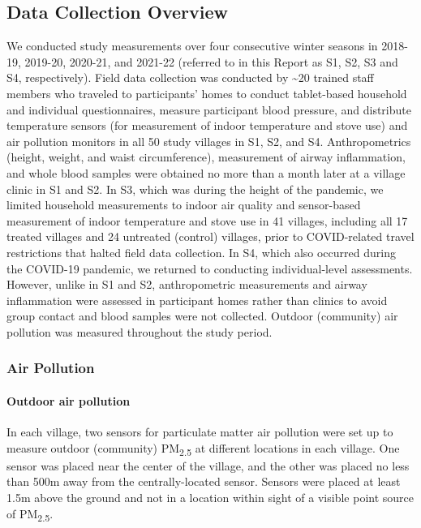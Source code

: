 \documentclass[
  letterpaper,
  DIV=11,
  numbers=noendperiod]{scrartcl}
\let\oldparagraph\paragraph
\renewcommand{\paragraph}[1]{\oldparagraph{#1}\mbox{}}
\begin{document}
\hypertarget{data-collection-overview}{%
\subsection{Data Collection Overview}\label{data-collection-overview}}

We conducted study measurements over four consecutive winter seasons in
2018-19, 2019-20, 2020-21, and 2021-22 (referred to in this Report as
S1, S2, S3 and S4, respectively). Field data collection was conducted by
\textasciitilde20 trained staff members who traveled to participants'
homes to conduct tablet-based household and individual questionnaires,
measure participant blood pressure, and distribute temperature sensors
(for measurement of indoor temperature and stove use) and air pollution
monitors in all 50 study villages in S1, S2, and S4. Anthropometrics
(height, weight, and waist circumference), measurement of airway
inflammation, and whole blood samples were obtained no more than a month
later at a village clinic in S1 and S2. In S3, which was during the
height of the pandemic, we limited household measurements to indoor air
quality and sensor-based measurement of indoor temperature and stove use
in 41 villages, including all 17 treated villages and 24 untreated
(control) villages, prior to COVID-related travel restrictions that
halted field data collection. In S4, which also occurred during the
COVID-19 pandemic, we returned to conducting individual-level
assessments. However, unlike in S1 and S2, anthropometric measurements
and airway inflammation were assessed in participant homes rather than
clinics to avoid group contact and blood samples were not collected.
Outdoor (community) air pollution was measured throughout the study
period.

\hypertarget{air-pollution}{%
\subsubsection{Air Pollution}\label{air-pollution}}

\hypertarget{outdoor-air-pollution}{%
\paragraph{Outdoor air pollution}\label{outdoor-air-pollution}}

In each village, two sensors for particulate matter air pollution were
set up to measure outdoor (community) PM\textsubscript{2.5} at different
locations in each village. One sensor was placed near the center of the
village, and the other was placed no less than 500m away from the
centrally-located sensor. Sensors were placed at least 1.5m above the
ground and not in a location within sight of a visible point source of
PM\textsubscript{2.5}.
\end{document}
